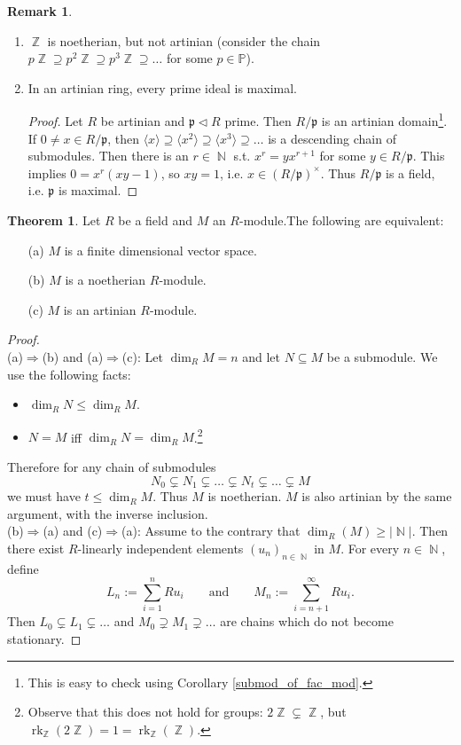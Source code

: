 \documentclass[12pt,a4paper]{report}
\theoremstyle{definition}
\newtheorem{theorem}{Theorem}[chapter] %
\newtheorem*{remark}{Remark}
\theoremstyle{num.custom-title}
\DeclareMathOperator{\rk}{rk}
\DeclareMathOperator{\N}{\mathbb{N}}
\DeclareMathOperator{\Z}{\mathbb{Z}}
\DeclareMathOperator{\imp}{\Rightarrow}
\DeclareMathOperator{\sse}{\subseteq}
\newcommand{\p}{\mathfrak{p}}
\renewcommand{\P}{\mathbb{P}}
\begin{document}
\begin{remark}\ 
\begin{enumerate}
\item $\Z$ is noetherian, but not artinian (consider the chain $p\Z \supseteq p^2\Z \supseteq p^3\Z \supseteq \ldots$ for some $p \in \P$).
\item In an artinian ring, every prime ideal is maximal.
\begin{proof}
Let $R$ be artinian and $\p \lhd R$ prime. Then $R/\p$ is an artinian domain\footnote{This is easy to check using Corollary \ref{submod_of_fac_mod}.}. If $0 \neq x \in R/\p$, then $\langle x \rangle \supseteq \langle x^2 \rangle \supseteq \langle x^3 \rangle \supseteq \ldots$ is a descending chain of submodules. Then there is an $r \in \N$ s.t. $x^r=yx^{r+1}$ for some $y \in R/\p$. This implies $0 = x^r(xy-1)$, so $xy=1$, i.e. $x \in (R/\p)^\times$. Thus $R/\p$ is a field, i.e. $\p$ is maximal.
\end{proof}
\end{enumerate}
\end{remark}

\begin{theorem}
Let $R$ be a field and $M$ an $R$-module.The following are equivalent:
\begin{itemize}
\item[(a)] $M$ is a finite dimensional vector space.
\item[(b)] $M$ is a noetherian $R$-module.
\item[(c)] $M$ is an artinian $R$-module.
\end{itemize}
\begin{proof}\ \\
(a)$\imp$(b) and (a)$\imp$(c): Let $\dim_R M = n$ and let $N \sse M$ be a submodule. We use the following facts:
\begin{itemize}
\item $\dim_R N \leq \dim_R M$.
\item $N=M$ iff $\dim_R N = \dim_R M$.\footnote{Observe that this does not hold for groups: $2\Z \subsetneq \Z$, but $\rk_{\Z}(2\Z) = 1 = \rk_{\Z}(\Z)$.}
\end{itemize}
Therefore for any chain of submodules 
\[
N_0 \subsetneq N_1 \subsetneq \ldots \subsetneq N_t \subsetneq \ldots \subsetneq M
\]
we must have $t \leq \dim_R M$. Thus $M$ is noetherian. $M$ is also artinian by the same argument, with the inverse inclusion.
\\[6pt]
(b)$\imp$(a) and (c)$\imp$(a): Assume to the contrary that $\dim_R(M) \geq |\N|$. Then there exist $R$-linearly independent elements $(u_n)_{n \in \N}$ in $M$. For every $n \in \N$, define
\[
L_n := \sum_{i=1}^n Ru_i \quad \quad \text{and} \quad \quad M_n := \sum_{i=n+1}^\infty Ru_i.
\]
Then $L_0 \subsetneq L_1 \subsetneq \ldots$ and $M_0 \supsetneq M_1 \supsetneq \ldots$ are chains which do not become stationary.
\end{proof}
\end{theorem}
\end{document}
